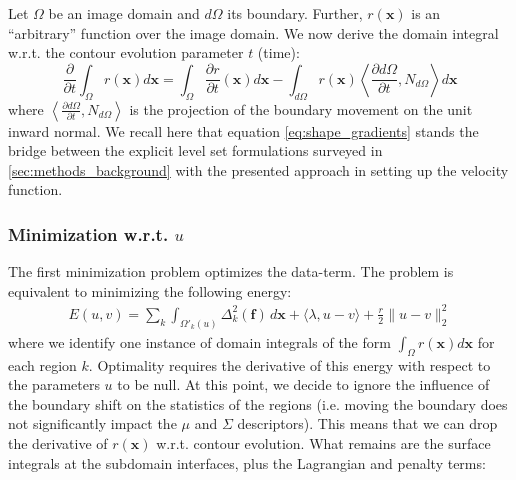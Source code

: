 Let $\Omega$ be an image domain and $d\Omega$ its boundary. Further, $r(\mathbf{x})$ 
is an ``arbitrary'' function over the image domain. We now derive the domain 
integral w.r.t. the contour evolution parameter $t$ (time):
\begin{equation}
\frac{\partial}{\partial t} \int_\Omega r(\mathbf{x}) d\mathbf{x} = \int_\Omega \frac{\partial r}{\partial t}(\mathbf{x}) d\mathbf{x} - \int_{d\Omega} r(\mathbf{x}) \left\langle \frac{\partial{d\Omega}}{\partial t}, N_{d\Omega}\right\rangle d\mathbf{x}
\label{eq:shape_gradients}
\end{equation}
where $\left\langle\frac{\partial{d\Omega}}{\partial t}, N_{d\Omega}\right\rangle$ is 
the projection of the boundary movement on the unit inward normal. We recall
here that equation \eqref{eq:shape_gradients} stands the bridge between the 
explicit level set formulations surveyed in \autoref{sec:methods_background} 
with the presented approach in setting up the velocity function.


\subsubsection{Minimization w.r.t. $u$}
The first minimization problem optimizes the data-term. The problem is equivalent 
to minimizing the following energy:
\begin{multline}
E(u,v) = \sum\limits_k \int_{\Omega'_k(u)} \Delta^2_k (\mathbf{f}) \,d\mathbf{x}
+ \langle \lambda, u-v \rangle + \frac{r}{2} \| u - v \|_2^2
\end{multline}
where we identify one instance of domain integrals of the form $\int_\Omega r(\mathbf{x}) 
d\mathbf{x}$ for each region $k$. Optimality requires the derivative of this energy 
with respect to the parameters $u$ to be null. At this point, we decide to ignore 
the influence of the boundary shift on the statistics of the regions (i.e. moving the 
boundary does not significantly impact the $\mu$ and $\Sigma$ descriptors). This means 
that we can drop the derivative of $r(\mathbf{x})$ w.r.t. contour evolution. 
What remains are the surface integrals at the subdomain interfaces, plus the Lagrangian 
and penalty terms:

